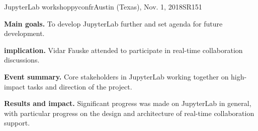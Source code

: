 \begin{event}{JupyterLab workshop}{pyconfr}{Austin (Texas), Nov. 1, 2018}{SR}{15}{1}{}

\textbf{Main goals.} To develop JupyterLab further and set agenda for future development.

\textbf{\ODK implication.} Vidar Fauske attended to participate in real-time collaboration discussions.

\textbf{Event summary.} Core stakeholders in JupyterLab working together on high-impact tasks and direction of the project.

\textbf{Results and impact.} Significant progress was made on JupyterLab in general, with particular progress on the design and architecture of real-time collaboration support.

\end{event}
